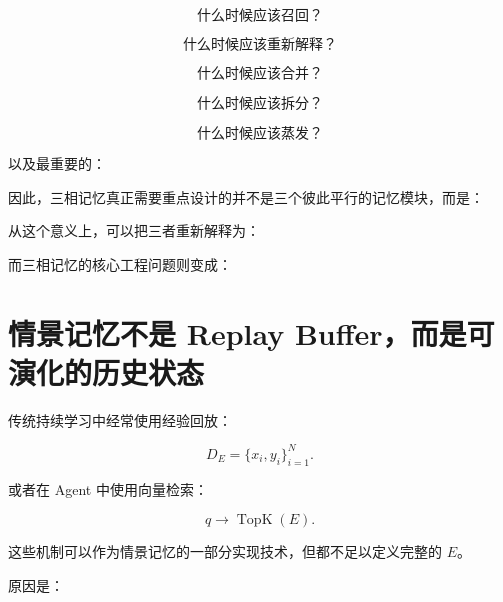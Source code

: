 \[
\text{什么时候应该召回？}
\]

\[
\text{什么时候应该重新解释？}
\]

\[
\text{什么时候应该合并？}
\]

\[
\text{什么时候应该拆分？}
\]

\[
\text{什么时候应该蒸发？}
\]

以及最重要的：

\begin{statementbox}
\centering
{}
\end{statementbox}

因此，三相记忆真正需要重点设计的并不是三个彼此平行的记忆模块，而是：

\begin{statementbox}
\centering
{}
\end{statementbox}

从这个意义上，可以把三者重新解释为：

\begin{statementbox}
\centering
{}
\end{statementbox}

而三相记忆的核心工程问题则变成：

\begin{statementbox}
\centering
{}
\end{statementbox}


\section{情景记忆不是 Replay Buffer，而是可演化的历史状态}

传统持续学习中经常使用经验回放：

\[
D_E
=
\{
x_i,y_i
\}_{i=1}^{N}.
\]

或者在 Agent 中使用向量检索：

\[
q
\rightarrow
\operatorname{TopK}(E).
\]

这些机制可以作为情景记忆的一部分实现技术，但都不足以定义完整的 \(E\)。

原因是：

